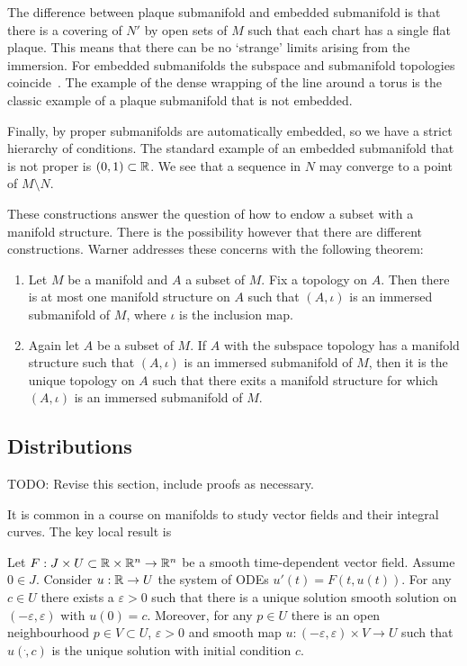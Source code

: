 The difference between plaque submanifold and embedded submanifold is that there is a covering of $N'$ by open sets of $M$ such that each chart has a single flat plaque.
This means that there can be no `strange' limits arising from the immersion.
For embedded submanifolds the subspace and submanifold topologies coincide~\cite[Prop~1.2.9]{Sharpe1997}.
The example of the dense wrapping of the line around a torus is the classic example of a plaque submanifold that is not embedded.

Finally, by \cite[Thm~1.2.11]{Sharpe1997} proper submanifolds are automatically embedded, so we have a strict hierarchy of conditions.
The standard example of an embedded submanifold that is not proper is $(0,1) \subset \mathbb{R}$.
We see that a sequence in $N$ may converge to a point of $M\setminus N$.

These constructions answer the question of how to endow a subset with a manifold structure.
There is the possibility however that there are different constructions.
Warner addresses these concerns with the following theorem: 
\begin{theorem}\label{thm:submanifolds}
\textup{\cite[Remark~1.33]{Warner1983}}
\begin{enumerate}
\item Let $M$ be a manifold and $A$ a subset of $M$. Fix a topology on $A$. Then there is at most one manifold structure on $A$ such that $(A,\iota)$ is an immersed submanifold of $M$, where $\iota$ is the inclusion map.
\item Again let $A$ be a subset of $M$. If $A$ with the subspace topology has a manifold structure such that $(A,\iota)$ is an immersed submanifold of $M$, then it is the unique topology on $A$ such that there exits a manifold structure for which $(A,\iota)$ is an immersed submanifold of $M$.
\end{enumerate}
\end{theorem}




\subsection{Distributions}

TODO: Revise this section, include proofs as necessary.

It is common in a course on manifolds to study vector fields and their integral curves.
The key local result is
\begin{theorem}
Let $F : J \times U \subset \mathbb{R}\times\mathbb{R}^n \to \mathbb{R}^n$ be a smooth time-dependent vector field. 
Assume $0 \in J$. 
Consider $u : \mathbb{R} \to U$ the system of ODEs $u'(t) = F(t,u(t))$.
For any $c \in U$ there exists a $\varepsilon > 0$ such that there is a unique solution smooth solution on $(-\varepsilon,\varepsilon)$ with $u(0) = c$.
Moreover, for any $p \in U$ there is an open neighbourhood $p \in V \subset U$, $\varepsilon > 0$ and smooth map $u : (-\varepsilon,\varepsilon) \times V \to U$ such that $u(\dot,c)$ is the unique solution with initial condition $c$.
\\\textup{\cite[Theorem~2.1.1]{Sharpe1997}}\cite[Theorem~1.2.1]{Ivey}
\end{theorem}


